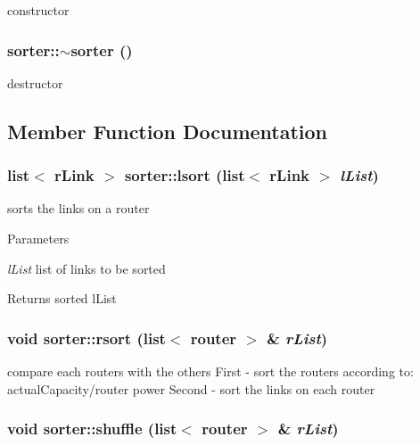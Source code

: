 constructor 

\hypertarget{classsorter_a27f9666807092c172a5ad6f0048d2b57}{
\subsubsection[{$\sim$sorter}]{\setlength{\rightskip}{0pt plus 5cm}sorter::$\sim$sorter ()}}
\label{classsorter_a27f9666807092c172a5ad6f0048d2b57}


destructor 



\subsection{Member Function Documentation}
\hypertarget{classsorter_a8c6f644537f597bc5ab57e2012655754}{
\subsubsection[{lsort}]{\setlength{\rightskip}{0pt plus 5cm}list$<$ {\bf rLink} $>$ sorter::lsort (list$<$ {\bf rLink} $>$ {\em lList})}}
\label{classsorter_a8c6f644537f597bc5ab57e2012655754}


sorts the links on a router 


\begin{DoxyParams}{Parameters}
\item[{\em lList}]list of links to be sorted \end{DoxyParams}
\begin{DoxyReturn}{Returns}
sorted lList 
\end{DoxyReturn}
\hypertarget{classsorter_aa5c4e14df085599365f57f144ffb25be}{
\subsubsection[{rsort}]{\setlength{\rightskip}{0pt plus 5cm}void sorter::rsort (list$<$ {\bf router} $>$ \& {\em rList})}}
\label{classsorter_aa5c4e14df085599365f57f144ffb25be}


compare each routers with the others First -\/ sort the routers according to: actualCapacity/router power Second -\/ sort the links on each router 

\hypertarget{classsorter_a4b7e91f19fb0bcb73c1e32d168353b40}{
\subsubsection[{shuffle}]{\setlength{\rightskip}{0pt plus 5cm}void sorter::shuffle (list$<$ {\bf router} $>$ \& {\em rList})}}
\label{classsorter_a4b7e91f19fb0bcb73c1e32d168353b40}


